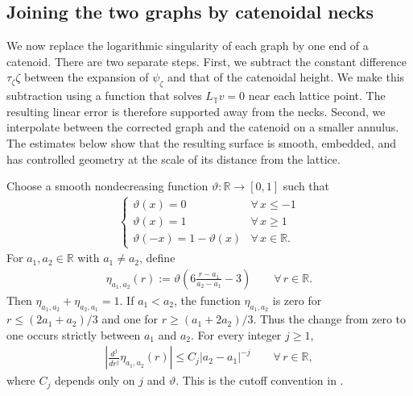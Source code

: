 \documentclass[a4paper,11pt,oneside,reqno]{amsart}
\numberwithin{equation}{section}
\theoremstyle{definition}
\begin{document}
\subsection{Joining the two graphs by catenoidal necks}

We now replace the logarithmic singularity of each graph by
one end of a catenoid. There are two separate steps. First,
we subtract the constant difference
$\tau_\zeta\zeta$ between the expansion of
$\psi_\zeta$ and that of the catenoidal height. We make this
subtraction using a function that solves
$L_{\mathbb T}v=0$ near each lattice point. The resulting
linear error is therefore supported away from the necks.
Second, we interpolate between the corrected graph and the
catenoid on a smaller annulus. The estimates below show that
the resulting surface is smooth, embedded, and has controlled
geometry at the scale of its distance from the lattice.

Choose a smooth nondecreasing function
$\vartheta:\mathbb R\to[0,1]$ such that
%
\begin{align*}
    \begin{cases}
        \vartheta(x)=0 & \forall\,x\le-1\\
        \vartheta(x)=1 & \forall\,x\ge 1\\
        \vartheta(-x)=1-\vartheta(x) & \forall\,x\in\mathbb{R}.
    \end{cases}
\end{align*}
%
For $a_1,a_2\in\mathbb R$ with $a_1\ne a_2$, define
%
\begin{align}
    \label{eq:s4-cutoff}
    \eta_{a_1,a_2}(r)
    :=\vartheta\left(6\frac{r-a_1}{a_2-a_1}-3\right)
    \qquad\forall\,r\in\mathbb R.
\end{align}
%
Then $\eta_{a_1,a_2}+\eta_{a_2,a_1}=1$. If $a_1<a_2$,
the function $\eta_{a_1,a_2}$ is zero for
$r\leq(2a_1+a_2)/3$ and one for
$r\geq(a_1+2a_2)/3$. Thus the change from zero to one
occurs strictly between $a_1$ and $a_2$. For every integer
$j\geq1$,
%
\begin{align*}
    \left|\frac{d^j}{dr^j}\eta_{a_1,a_2}(r)\right|
    \leq C_j|a_2-a_1|^{-j}
    \qquad\forall\,r\in\mathbb R,
\end{align*}
%
where $C_j$ depends only on $j$ and $\vartheta$.
This is the cutoff convention in
\cite[Definition~1.5]{KapouleasMcGrathLD}.
\end{document}
